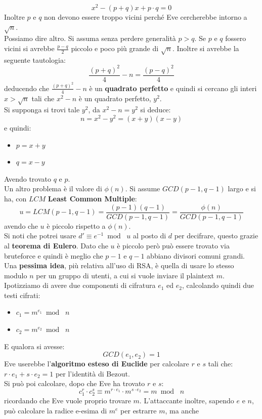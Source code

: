 \documentclass[a4paper,12pt, oneside]{book}
\begin{document}
\[x^2-(p+q)x+p\cdot q=0\]
Inoltre $p$ e $q$ non devono essere troppo vicini perché Eve cercherebbe intorno
a $\sqrt{n}$.\\
Possiamo dire altro. Si assuma senza perdere generalità $p>q$. Se $p$ e $q$
fossero vicini si avrebbe $\frac{p-q}{2}$ piccolo e poco più grande di
$\sqrt{n}$. Inoltre si avrebbe la seguente tautologia:
\[\frac{(p+q)^2}{4}-n=\frac{(p-q)^2}{4}\]
deducendo che $\frac{(p+q)^2}{4}-n$ è un \textbf{quadrato perfetto} e quindi si
cercano gli interi $x> \sqrt{n}$ tali che $x^2-n$ è un quadrato perfetto,
$y^2$.\\
Si supponga si trovi tale $y^2$, da $x^2-n=y^2$ si deduce:
\[n=x^2-y^2=(x+y)(x-y)\]
e quindi:
\begin{itemize}
  \item $p=x+y$
  \item $q=x-y$
\end{itemize}
Avendo trovato $q$ e $p$.\\
Un altro problema è il valore di $\phi(n)$. 
Si assume $GCD(p-1,q-1)$ largo e si ha, con $LCM$ \textbf{Least Common
  Multiple}: 
\[u=LCM(p-1,q-1)=\frac{(p-1)(q-1)}{GCD(p-1,q-1)}=\frac{\phi(n)}{GCD(p-1,q-1)}\]
avendo che $u$ è piccolo rispetto a $\phi(n)$.\\
Si noti che potrei usare $d'\equiv e^{-1}\bmod \,\,u$ al posto di $d$ per
decifrare, questo grazie al \textbf{teorema di Eulero}. Dato che $u$ è piccolo
però può essere trovato via bruteforce e quindi è meglio che $p-1$ e $q-1$
abbiano divisori comuni grandi.\\
Una \textbf{pessima idea}, più relativa all'uso di RSA, è quella di usare lo
stesso modulo $n$ per un gruppo 
di utenti, a cui si vuole inviare il plaintext $m$. Ipotizziamo di avere due
componenti di cifratura $e_1$ ed $e_2$, calcolando quindi due testi cifrati:
\begin{itemize}
  \item $c_1=m^{e_1}\bmod \,\,n$
  \item $c_2=m^{e_2}\bmod \,\,n$
\end{itemize}
E qualora si avesse:
\[GCD(e_1,e_2)=1\]
Eve userebbe l'\textbf{algoritmo esteso di Euclide} per calcolare $r$ e $s$ tali
che:
$r\cdot e_1+s\cdot e_2=1$
per l'identità di Bezout.\\
Si può poi calcolare, dopo che Eve ha trovato $r$ e $s$:
\[c_1^r\cdot c_2^s\equiv m^{r\cdot e_1}\cdot m^{s\cdot e_2}=m\bmod \,\,n\]
ricordando che Eve vuole proprio trovare $m$. L'attaccante inoltre, sapendo $e$
e $n$, può calcolare la radice e-esima di $m^e$ per estrarre $m$, ma anche
\end{document}
